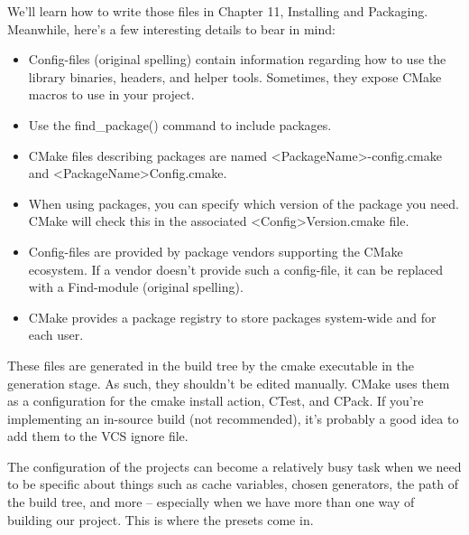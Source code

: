 We'll learn how to write those files in Chapter 11, Installing and Packaging. Meanwhile, here's a few interesting details to bear in mind:

\begin{itemize}
\item 
Config-files (original spelling) contain information regarding how to use the library binaries, headers, and helper tools. Sometimes, they expose CMake macros to use in your project.

\item 
Use the find\_package() command to include packages.

\item 
CMake files describing packages are named <PackageName>-config.cmake and <PackageName>Config.cmake.

\item 
When using packages, you can specify which version of the package you need. CMake will check this in the associated <Config>Version.cmake file.

\item 
Config-files are provided by package vendors supporting the CMake ecosystem. If a vendor doesn't provide such a config-file, it can be replaced with a Find-module (original spelling).

\item 
CMake provides a package registry to store packages system-wide and for each user.
\end{itemize}



These files are generated in the build tree by the cmake executable in the generation stage. As such, they shouldn't be edited manually. CMake uses them as a configuration for the cmake install action, CTest, and CPack. If you're implementing an in-source build (not recommended), it's probably a good idea to add them to the VCS ignore file.



The configuration of the projects can become a relatively busy task when we need to be specific about things such as cache variables, chosen generators, the path of the build tree, and more – especially when we have more than one way of building our project. This is where the presets come in.

